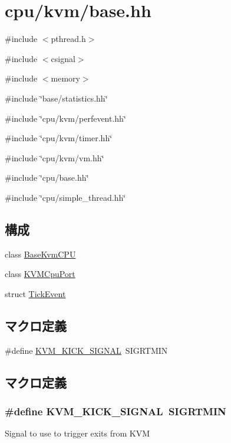 \hypertarget{cpu_2kvm_2base_8hh}{
\section{cpu/kvm/base.hh}
\label{cpu_2kvm_2base_8hh}
}
{\ttfamily \#include $<$pthread.h$>$}\par
{\ttfamily \#include $<$csignal$>$}\par
{\ttfamily \#include $<$memory$>$}\par
{\ttfamily \#include \char`\"{}base/statistics.hh\char`\"{}}\par
{\ttfamily \#include \char`\"{}cpu/kvm/perfevent.hh\char`\"{}}\par
{\ttfamily \#include \char`\"{}cpu/kvm/timer.hh\char`\"{}}\par
{\ttfamily \#include \char`\"{}cpu/kvm/vm.hh\char`\"{}}\par
{\ttfamily \#include \char`\"{}cpu/base.hh\char`\"{}}\par
{\ttfamily \#include \char`\"{}cpu/simple\_\-thread.hh\char`\"{}}\par
\subsection*{構成}
\begin{DoxyCompactItemize}
\item 
class \hyperlink{classBaseKvmCPU}{BaseKvmCPU}
\item 
class \hyperlink{classBaseKvmCPU_1_1KVMCpuPort}{KVMCpuPort}
\item 
struct \hyperlink{structBaseKvmCPU_1_1TickEvent}{TickEvent}
\end{DoxyCompactItemize}
\subsection*{マクロ定義}
\begin{DoxyCompactItemize}
\item 
\#define \hyperlink{cpu_2kvm_2base_8hh_a7aba22a2f8cca986ad7802c54c654847}{KVM\_\-KICK\_\-SIGNAL}~SIGRTMIN
\end{DoxyCompactItemize}


\subsection{マクロ定義}
\hypertarget{cpu_2kvm_2base_8hh_a7aba22a2f8cca986ad7802c54c654847}{
\subsubsection[{KVM\_\-KICK\_\-SIGNAL}]{\setlength{\rightskip}{0pt plus 5cm}\#define KVM\_\-KICK\_\-SIGNAL~SIGRTMIN}}
\label{cpu_2kvm_2base_8hh_a7aba22a2f8cca986ad7802c54c654847}
Signal to use to trigger exits from KVM 